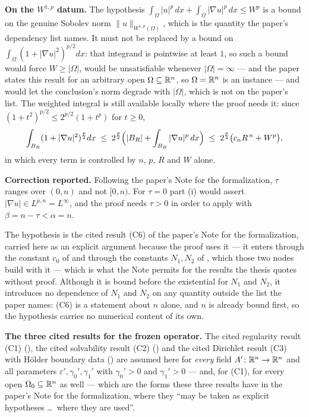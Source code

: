 \begin{theorem}[Theorem 3]
\noindent\textbf{On the $W^{1,p}$ datum.}  The hypothesis
$\int_\Omega|u|^p\,dx+\int_\Omega|\nabla u|^p\,dx\le W^p$ is a bound on the
genuine Sobolev norm $\|u\|_{W^{1,p}(\Omega)}$, which is the quantity the
paper's dependency list names.  It must not be replaced by a bound on
$\int_\Omega(1+|\nabla u|^2)^{p/2}dx$: that integrand is pointwise at least $1$,
so such a bound would force $W\ge|\Omega|$, would be unsatisfiable whenever
$|\Omega|=\infty$ --- and the paper states this result for an arbitrary open
$\Omega\subseteq\mathbb{R}^n$, so $\Omega=\mathbb{R}^n$ is an instance --- and would let the
conclusion's norm degrade with $|\Omega|$, which is not on the paper's list.
The weighted integral is still available locally where the proof needs it: since
$(1+t^2)^{p/2}\le2^{p/2}(1+t^p)$ for $t\ge0$,
\[
\int_{B_R}(1+|\nabla u|^2)^{\frac p2}dx
\;\le\;2^{\frac p2}\Bigl(|B_R|+\int_{B_R}|\nabla u|^p\,dx\Bigr)
\;\le\;2^{\frac p2}\bigl(c_nR^{\,n}+W^p\bigr),
\]
in which every term is controlled by $n$, $p$, $R$ and $W$ alone.

\medskip
\noindent\textbf{Correction reported.}  Following the paper's Note for the
formalization, $\tau$ ranges over $(0,n)$ and not $[0,n)$.  For $\tau=0$ part
(i) would assert $|\nabla u|\in L^{p,n}=L^\infty$, and the proof needs $\tau>0$
in order to apply  with
$\beta=n-\tau<\alpha=n$.

The hypothesis  is the cited result (C6) of the
paper's Note for the formalization, carried here as an explicit argument because
the proof uses it --- it enters through the constant $c_0$ of
 and through the constants $N_1,N_2$ of
, which those two nodes build with it ---
which is what the Note permits for the results the thesis quotes without proof.  Although it is
bound before the existential for $N_1$ and $N_2$, it introduces no dependence of
$N_1$ and $N_2$ on any quantity outside the list the paper names: (C6) is a statement
about $n$ alone, and $n$ is already bound first, so the hypothesis carries no
numerical content of its own.

\medskip
\noindent\textbf{The three cited results for the frozen operator.}  The cited
regularity result (C1) (), the cited solvability
result (C2) () and the cited Dirichlet result (C3)
with H\"older boundary data () are assumed here
for \emph{every} field $A'\colon\mathbb{R}^n\to\mathbb{R}^n$ and all parameters
$\varepsilon',\gamma_0',\gamma_1'$ with $\gamma_0'>0$ and $\gamma_1'>0$ --- and,
for (C1), for every open $\Omega_0\subseteq\mathbb{R}^n$ as well --- which are the forms
these three results have in the paper's Note for the formalization, where they
``may be taken as explicit hypotheses \ldots\ where they are used''.


\end{theorem}
